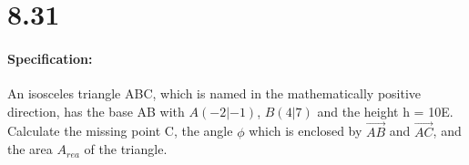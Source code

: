 \section{8.31}
\paragraph{Specification:}
An isosceles triangle ABC, which is named in the mathematically positive direction, has the 
base AB with $A(-2|-1)$, $B(4|7)$ and the height h = 10E. Calculate the missing point C, the angle
$\phi$ which is enclosed by $\vec{AB}$ and $\vec{AC}$, and the area $A_{rea}$ of the triangle.

\def\height{10}

\def\A{\begin{pmatrix}
    -2 \\ 
    -1
\end{pmatrix}}

\def\B{\begin{pmatrix}
    4 \\ 
    7
\end{pmatrix}}

\def\AB{\begin{pmatrix}
    6 \\ 
    8
\end{pmatrix}}

\def\vAC{\begin{pmatrix}
    -5 \\ 
    10
\end{pmatrix}}

\def\ABhalf{\begin{pmatrix}
    3 \\ 
    4
\end{pmatrix}}

\def\ABmid{\begin{pmatrix}
    1 \\ 
    3
\end{pmatrix}}

\def\ABnorm{\begin{pmatrix}
    -8 \\ 
    6
\end{pmatrix}}

\def\ABnrommag{\sqrt{(-8)^2 + 6^2}}

\def\ABmidzero{\begin{pmatrix}
    -0.8 \\ 
    0.6
\end{pmatrix}}

\def\vOC{\begin{pmatrix}
        -7 \\ 
        9
\end{pmatrix}}

